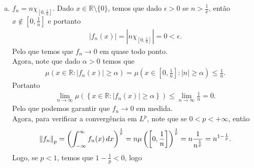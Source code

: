 \begin{homeworkProblem}[6]
\begin{solution}
\begin{enumerate}[a)]
\begin{align*}
          \lim_{n \to \infty}\norm{f_n}_{\infty}=\lim_{n \to \infty}1=1.
        \end{align*}
        Pelo que não temos convergência em $L^{\infty}$.\\
        Por último, note que se pegamos $m\in\mathbb{Z}^{+}$, então temos que para $x\in [m,m+1]$ se cumpre que
        \begin{align*}
          |f_m(x)|=|1|.
        \end{align*}
        Logo note que se pegamos $\epsilon=\frac{1}{2}$, dado $n_0\in\mathbb{Z}^{+}$ nos sempre temos que para todo $n> n_0$, e todo $x\in [n,n+1]$ se cumpre que
        \begin{align*}
          |f_{n}(x)|=1>\epsilon.
        \end{align*}
        E como $\mu([n,n+1])=1$, temos que $f_n$ não convêrge para $0$ quase uniformemente.
      \item $f_n=n\chi_{[0,\frac{1}{n}]}$.
        Dado $x\in\mathbb{R}\setminus\{0\}$, temos que dado $\epsilon>0$ se $n>\frac{1}{x}$, então $x\notin [0,\frac{1}{n}]$ e portanto 
        \begin{align*}
          |f_n(x)|=|n\chi_{[0,\frac{1}{n}]}|=0<\epsilon.
        \end{align*}
        Pelo que temos que $f_n\to 0$ em quase todo ponto.\\
        Agora, note que dado $\alpha>0$ temos que
        \begin{align*}
          \mu\left( x\in \mathbb{R}: |f_n(x)|\geq \alpha \right)=\mu\left( x\in \left[0,\frac{1}{n}\right]: |n|\geq \alpha \right)\leq \frac{1}{n}.
        \end{align*}
        Portanto
        \begin{align*}
          \lim_{n \to \infty}\mu\left( \left\{ x\in\mathbb{R}: |f_n(x)|\geq \alpha \right\}\right)\leq \lim_{n \to \infty}\frac{1}{n}=0.
        \end{align*}
        Pelo que podemos garantir que $f_n\to 0$ em medida.\\
        Agora, para verificar a convergência em $L^{p}$, note que se $0<p<+\infty$, então
        \begin{align*}
          \left\|f_n\right\|_{p}=\left( \int_{-\infty}^{\infty}f_n(x)\,dx \right)^{\frac{1}{p}}=n\mu\left(\left[ 0,\frac{1}{n} \right] \right)^{\frac{1}{p}}=n \frac{1}{n^{\frac{1}{p}}}=n^{1-\frac{1}{p}}.
        \end{align*}
        Logo, se $p<1$, temos que $1-\frac{1}{p}<0$, logo
        \begin{align*}

\end{align*}
\end{enumerate}
\end{solution}
\end{homeworkProblem}
